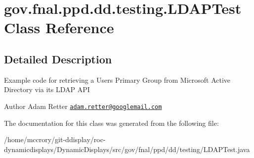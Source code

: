 \hypertarget{classgov_1_1fnal_1_1ppd_1_1dd_1_1testing_1_1LDAPTest}{\section{gov.\-fnal.\-ppd.\-dd.\-testing.\-L\-D\-A\-P\-Test Class Reference}
\label{classgov_1_1fnal_1_1ppd_1_1dd_1_1testing_1_1LDAPTest}
}


\subsection{Detailed Description}
Example code for retrieving a Users Primary Group from Microsoft Active Directory via its L\-D\-A\-P A\-P\-I

\begin{DoxyAuthor}{Author}
Adam Retter \href{mailto:adam.retter@googlemail.com}{\tt adam.\-retter@googlemail.\-com} 
\end{DoxyAuthor}


The documentation for this class was generated from the following file\-:\begin{DoxyCompactItemize}
\item 
/home/mccrory/git-\/ddisplay/roc-\/dynamicdisplays/\-Dynamic\-Displays/src/gov/fnal/ppd/dd/testing/L\-D\-A\-P\-Test.\-java\end{DoxyCompactItemize}
